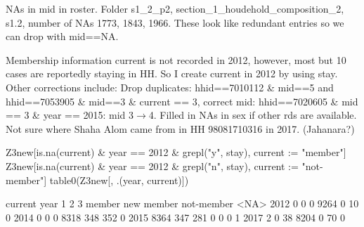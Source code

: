 NAs in \textsf{mid} in roster. Folder {\footnotesize s1\_2\_p2, section\_1\_houdehold\_composition\_2, s1.2}, number of NAs 1773, 1843, 1966. These look like redundant entries so we can drop with \textsf{mid}==NA. \gobblepars


Membership information \textsf{current} is not recorded in 2012, however, most but 10 cases are reportedly \textsf{stay}ing in HH. So I create \textsf{current} in 2012 by using \textsf{stay}. Other corrections include: Drop duplicates: hhid==7010112 \& mid==5 and hhid==7053905 \& mid==3 \& current == 3, correct mid: hhid==7020605 \& mid == 3 \& year == 2015: mid 3$\rightarrow$4. Filled in NAs in \textsf{sex} if other rds are available. Not sure where Shaha Alom came from in HH 98081710316 in 2017. (Jahanara?)

\begin{Schunk}
\begin{Sinput}
Z3new[is.na(current) & year == 2012 & grepl("y", stay), current := "member"]
Z3new[is.na(current) & year == 2012 & grepl("n", stay), current := "not-member"]
table0(Z3new[, .(year, current)])
\end{Sinput}
\begin{Soutput}
      current
year      1    2    3 member new member not-member <NA>
  2012    0    0    0   9264          0         10    0
  2014    0    0    0   8318        348        352    0
  2015 8364  347  281      0          0          0    1
  2017    2    0   38   8204          0         70    0
\end{Soutput}
\end{Schunk}
